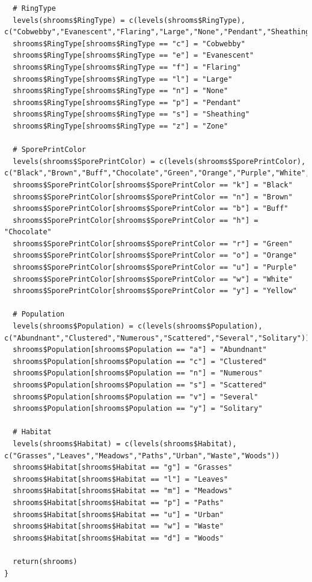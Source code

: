 \documentclass[10pt  ,usenames, dvipsnames]{article}\usepackage[]{graphicx}\usepackage[]{color}
\begin{document}
\begin{lstlisting}
  # RingType
  levels(shrooms$RingType) = c(levels(shrooms$RingType), c("Cobwebby","Evanescent","Flaring","Large","None","Pendant","Sheathing","Zone"))
  shrooms$RingType[shrooms$RingType == "c"] = "Cobwebby"
  shrooms$RingType[shrooms$RingType == "e"] = "Evanescent"
  shrooms$RingType[shrooms$RingType == "f"] = "Flaring"
  shrooms$RingType[shrooms$RingType == "l"] = "Large"
  shrooms$RingType[shrooms$RingType == "n"] = "None"
  shrooms$RingType[shrooms$RingType == "p"] = "Pendant"
  shrooms$RingType[shrooms$RingType == "s"] = "Sheathing"
  shrooms$RingType[shrooms$RingType == "z"] = "Zone"
  
  # SporePrintColor
  levels(shrooms$SporePrintColor) = c(levels(shrooms$SporePrintColor), c("Black","Brown","Buff","Chocolate","Green","Orange","Purple","White","Yellow"))
  shrooms$SporePrintColor[shrooms$SporePrintColor == "k"] = "Black"
  shrooms$SporePrintColor[shrooms$SporePrintColor == "n"] = "Brown"
  shrooms$SporePrintColor[shrooms$SporePrintColor == "b"] = "Buff"
  shrooms$SporePrintColor[shrooms$SporePrintColor == "h"] = "Chocolate"
  shrooms$SporePrintColor[shrooms$SporePrintColor == "r"] = "Green"
  shrooms$SporePrintColor[shrooms$SporePrintColor == "o"] = "Orange"
  shrooms$SporePrintColor[shrooms$SporePrintColor == "u"] = "Purple"
  shrooms$SporePrintColor[shrooms$SporePrintColor == "w"] = "White"
  shrooms$SporePrintColor[shrooms$SporePrintColor == "y"] = "Yellow"
  
  # Population
  levels(shrooms$Population) = c(levels(shrooms$Population), c("Abundnant","Clustered","Numerous","Scattered","Several","Solitary"))
  shrooms$Population[shrooms$Population == "a"] = "Abundnant"
  shrooms$Population[shrooms$Population == "c"] = "Clustered"
  shrooms$Population[shrooms$Population == "n"] = "Numerous"
  shrooms$Population[shrooms$Population == "s"] = "Scattered"
  shrooms$Population[shrooms$Population == "v"] = "Several"
  shrooms$Population[shrooms$Population == "y"] = "Solitary"
  
  # Habitat
  levels(shrooms$Habitat) = c(levels(shrooms$Habitat), c("Grasses","Leaves","Meadows","Paths","Urban","Waste","Woods"))
  shrooms$Habitat[shrooms$Habitat == "g"] = "Grasses"
  shrooms$Habitat[shrooms$Habitat == "l"] = "Leaves"
  shrooms$Habitat[shrooms$Habitat == "m"] = "Meadows"
  shrooms$Habitat[shrooms$Habitat == "p"] = "Paths"
  shrooms$Habitat[shrooms$Habitat == "u"] = "Urban"
  shrooms$Habitat[shrooms$Habitat == "w"] = "Waste"
  shrooms$Habitat[shrooms$Habitat == "d"] = "Woods"
  
  return(shrooms)
}
\end{lstlisting}
\label{figHelper}
\end{document}
